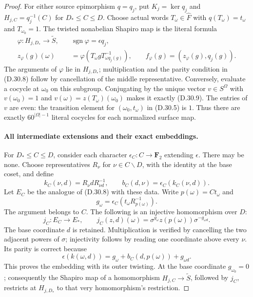 \begin{proof}
For either source epimorphism $q=q_j$, put
$K_j=\ker q_j$ and $H_{j,C}=q_j^{-1}(C)$ for
$D_*\leq C\leq D$.  Choose actual words
$T_\omega\in\widehat F$ with $q(T_\omega)=t_\omega$
and $T_{\omega_0}=1$.  The twisted nonabelian
Shapiro map is the literal formula
\[
 \begin{split}
 \varphi:H_{j,D_*}\longrightarrow\widetilde S,\quad
 &\operatorname{sgn}\varphi=\epsilon q_j,\\
 z_\varphi(g)(\omega)
   & =\varphi(T_\omega gT_{\omega q_j(g)}^{-1}),\qquad
 f_\varphi(g)=(z_\varphi(g),q_j(g)).
 \end{split}
 \tag{D.30.9}
\]
The arguments of $\varphi$ lie in $H_{j,D_*}$;
multiplication and the parity condition in
\textup{(D.30.8)} follow by cancellation of the
middle representative.  Conversely, evaluate a
cocycle at $\omega_0$ on this subgroup.  Conjugating
by the unique vector $v\in S^{\Omega}$ with
$v(\omega_0)=1$ and
$v(\omega)=z(T_\omega)(\omega_0)$ makes it exactly
\textup{(D.30.9)}.  The entries of $v$ are even:
the transition element for $(\omega_0,t_\omega)$
in \textup{(D.30.5)} is $1$.
Thus there are exactly $60^{|\Omega|-1}$ literal
cocycles for each normalized surface map.

\paragraph{All intermediate extensions and their exact embeddings.}
For $D_*\leq C\leq D$, consider each character
$\epsilon_C:C\to\mathbf F_2$ extending $\epsilon$.
There may be none.  Choose representatives
$R_\nu$ for $\nu\in C\backslash D$, with the
identity at the base coset, and define
\[
 k_C(\nu,d)=R_\nu dR_{\nu d}^{-1},\qquad
 b_C(d,\nu)=\epsilon_C(k_C(\nu,d)).
 \tag{D.30.10}
\]
Let $E_C$ be the analogue of \textup{(D.30.8)}
with these data.  Write $p(\omega)=Ct_\omega$ and
\[
        g_\omega=\epsilon_C(t_\omega R_{p(\omega)}^{-1}).
 \tag{D.30.11}
\]
The argument belongs to $C$.  The following is an
injective homomorphism over $D$:
\[
 j_C:E_C\longrightarrow E_*,\qquad
 j_C(z,d)(\omega)=
       \sigma^{g_\omega}z(p(\omega))
                       \sigma^{-g_{\omega d}}.
 \tag{D.30.12}
\]
The base coordinate $d$ is retained.  Multiplication
is verified by cancelling the two adjacent powers
of $\sigma$; injectivity follows by reading one
coordinate above every $\nu$.  Its parity is
correct because
\[
 \epsilon(k(\omega,d))=
 g_\omega+b_C(d,p(\omega))+g_{\omega d}.
 \tag{D.30.13}
\]
This proves the embedding with its outer twisting.
At the base coordinate $g_{\omega_0}=0$; consequently
the Shapiro map of a homomorphism
$H_{j,C}\to\widetilde S$, followed by $j_C$, restricts
at $H_{j,D_*}$ to that very homomorphism's restriction.


\end{proof}
